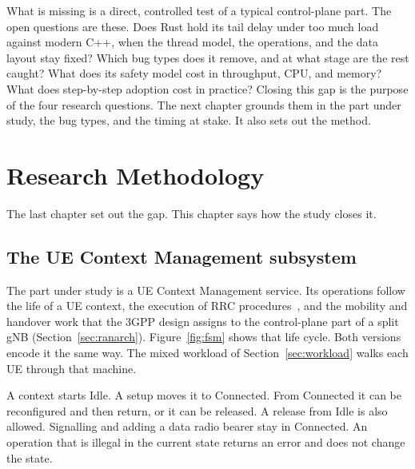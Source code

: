 \documentclass[english,oneside,a4paper,censored,csm,software-track-2020]{HYthesisML}
\begin{document}
What is missing is a direct, controlled test of a typical control-plane part.
The open questions are these.
Does Rust hold its tail delay under too much load against modern C++, when the thread model, the operations, and the data layout stay fixed?
Which bug types does it remove, and at what stage are the rest caught?
What does its safety model cost in throughput, CPU, and memory?
What does step-by-step adoption cost in practice?
Closing this gap is the purpose of the four research questions.
The next chapter grounds them in the part under study, the bug types, and the timing at stake.
It also sets out the method.


\chapter{Research Methodology\label{chapter:methodology}}

The last chapter set out the gap. This chapter says how the study closes it.

\section{The UE Context Management subsystem}\label{sec:uecm}
The part under study is a UE Context Management service.
Its operations follow the life of a UE context, the execution of RRC procedures~\cite{3gpp38331}, and the mobility and handover work that the 3GPP design assigns to the control-plane part of a split gNB (Section~\ref{sec:ranarch}).
Figure~\ref{fig:fsm} shows that life cycle. Both versions encode it the same way.
The mixed workload of Section~\ref{sec:workload} walks each UE through that machine.

A context starts Idle. A setup moves it to Connected. From Connected it can be reconfigured and then return, or it can be released. A release from Idle is also allowed. Signalling and adding a data radio bearer stay in Connected. An operation that is illegal in the current state returns an error and does not change the state.
\end{document}
